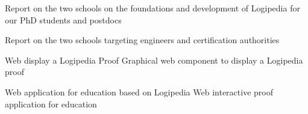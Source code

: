 \begin{workpackage}[id=dissemination,type=MGT,
  short={Dissemination, communication and exploitation},
  title={Dissemination, communication and exploitation},
  lead=Inr]
\begin{wpdelivs}
  \begin{wpdeliv}[due=24,miles=???,id=school-second-phd,dissem=PU,nature=R,lead=Bir]{Report on the two schools on the foundations and development of Logipedia for our PhD students and postdocs}
  \end{wpdeliv}


  \begin{wpdeliv}[due=24,miles=???,id=school-second-certif,dissem=PU,nature=R,lead=Irt]{Report on the two schools targeting engineers and certification authorities}
  \end{wpdeliv}


  \begin{wpdeliv}[due=36,miles=???,id=edu-display,dissem=PU,nature=D,lead=Edu]{Web display a Logipedia Proof}
    Graphical web component to display a Logipedia proof
  \end{wpdeliv}

  \begin{wpdeliv}[due=36,miles=???,id=edu-app,dissem=PU,nature=OTHER,lead=Edu]{Web application for education based on Logipedia}
    Web interactive proof application for education
  \end{wpdeliv}

\end{wpdelivs}

\end{workpackage}


